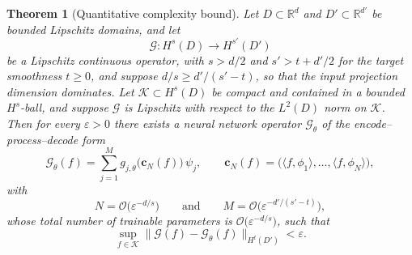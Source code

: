 \documentclass[11pt]{article}
\theoremstyle{plain}
\newtheorem{theorem}{Theorem}
\theoremstyle{definition}
\theoremstyle{remark}
\begin{document}
\begin{theorem}[Quantitative complexity bound]
\label{thm:quantitative}
Let $D \subset \mathbb{R}^{d}$ and $D' \subset \mathbb{R}^{d'}$ be bounded
Lipschitz domains, and let
\[
  \mathcal{G} : H^{s}(D) \longrightarrow H^{s'}(D')
\]
be a Lipschitz continuous operator, with $s > d/2$ and $s' > t + d'/2$ for the
target smoothness $t \ge 0$, and suppose $d/s \ge d'/(s'-t)$, so that the input projection dimension dominates. Let $\mathcal{K} \subset H^{s}(D)$ be compact and contained in a bounded $H^{s}$-ball, and suppose $\mathcal{G}$ is Lipschitz with respect to the $L^2(D)$ norm on $\mathcal{K}$. Then for every $\varepsilon > 0$ there exists a neural network operator $\mathcal{G}_\theta$ of the encode--process--decode form
\[
  \mathcal{G}_\theta(f)
    = \sum_{j=1}^{M} g_{j,\theta}\big(\mathbf{c}_N(f)\big)\,\psi_j,
  \qquad
  \mathbf{c}_N(f) = \big(\langle f,\phi_1\rangle,\dots,\langle f,\phi_N\rangle\big),
\]
with
\[
  N = \mathcal{O}\!\big(\varepsilon^{-d/s}\big)
  \qquad\text{and}\qquad
  M = \mathcal{O}\!\big(\varepsilon^{-d'/(s'-t)}\big),
\]
whose total number of trainable parameters is
$\mathcal{O}\!\big(\varepsilon^{-d/s}\big)$, such that
\[
  \sup_{f \in \mathcal{K}}
    \big\| \mathcal{G}(f) - \mathcal{G}_\theta(f) \big\|_{H^{t}(D')}
    < \varepsilon .
\]
\end{theorem}
\end{document}
